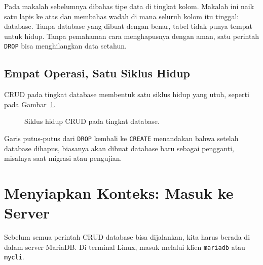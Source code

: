 \documentclass[11pt,a4paper]{article}
\begin{document}
Pada makalah sebelumnya dibahas tipe data di tingkat kolom. Makalah ini naik satu lapis ke atas dan membahas wadah di mana seluruh kolom itu tinggal: database. Tanpa database yang dibuat dengan benar, tabel tidak punya tempat untuk hidup. Tanpa pemahaman cara menghapusnya dengan aman, satu perintah \texttt{DROP} bisa menghilangkan data setahun.

\subsection{Empat Operasi, Satu Siklus Hidup}

CRUD pada tingkat database membentuk satu siklus hidup yang utuh, seperti pada Gambar~\ref{fig:crud-cycle}.

\begin{figure}[H]
	\centering
	\caption{Siklus hidup CRUD pada tingkat database.}
	\label{fig:crud-cycle}
\end{figure}

Garis putus-putus dari \texttt{DROP} kembali ke \texttt{CREATE} menandakan bahwa setelah database dihapus, biasanya akan dibuat database baru sebagai pengganti, misalnya saat migrasi atau pengujian.

\section{Menyiapkan Konteks: Masuk ke Server}

Sebelum semua perintah CRUD database bisa dijalankan, kita harus berada di dalam server MariaDB. Di terminal Linux, masuk melalui klien \texttt{mariadb} atau \texttt{mycli}.
\end{document}
